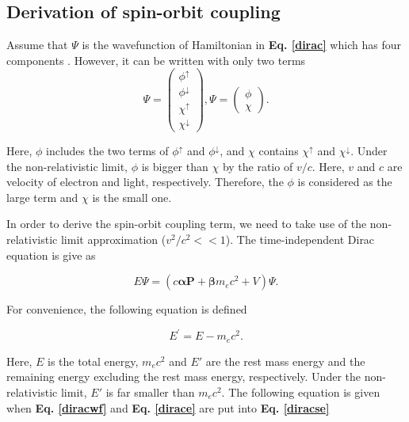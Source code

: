 \documentclass[a4paper, 12pt, titlepage,oneside,drop]{kthesis}
\begin{document}
\subsection{Derivation of spin-orbit coupling}

\noindent  Assume that $\Psi$ is the wavefunction of Hamiltonian in \textbf {Eq. \ref{dirac}} which has four components \cite{thaller1992dirac, dirac1930principles}. However, it can be 
written with only two terms
\begin{equation}\label{diracwf}
\Psi = \left( \begin{array}{c}
\phi^{\uparrow} \\
\phi^{\downarrow} \\
\chi^{\uparrow} \\
\chi^{\downarrow} \end{array} \right),
 \Psi = \left(\begin{array}{c}
\phi \\               
\chi \end{array} \right).
\end{equation}

\noindent Here, $\phi$ includes the two terms of $\phi^{\uparrow}$ and $\phi^{\downarrow}$, and $\chi$ contains  $\chi^{\uparrow}$ and $\chi^{\downarrow}$.
Under the non-relativistic limit, $\phi$ is bigger than $\chi$ by the ratio of $v/c$. Here, $v$ and $c$ are velocity of electron and light, respectively.
Therefore, the $\phi$ is considered as the large term and $\chi$ is the small one.

\noindent In order to derive the spin-orbit coupling term, we need to take use of the non-relativistic limit approximation ($v^2/c^2 << 1$). The time-independent Dirac equation is give as

\begin{equation}\label{diracse}
 E \Psi = (c \boldsymbol{\alpha} \textbf{P} + \boldsymbol{\beta}m_ec^{2} + V) \Psi.
\end{equation}

\noindent For convenience, the following equation is defined

\begin{equation}\label{dirace}
E^{\prime} = E - m_ec^2.
\end{equation}

\noindent Here, $E$ is the total energy, $m_ec^2$ and $E'$ are the rest mass energy and the remaining energy excluding the rest mass energy, respectively. Under the non-relativistic limit, 
$E'$ is far smaller than $m_ec^2$. The following equation is given when \textbf{Eq. \ref{diracwf}} and \textbf{Eq. \ref{dirace}} are put into \textbf{Eq. \ref{diracse}}
\end{document}
